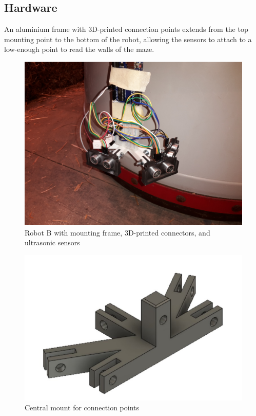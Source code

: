 \documentclass[11pt]{article}
\begin{document}
	\subsection{Hardware}
	An aluminium frame with 3D-printed connection points extends from the top mounting point to the bottom of the robot, allowing the sensors to attach to a low-enough point to read the walls of the maze.
	
	\begin{figure}[h]
		\centering
		\includegraphics[scale=0.1]{ultrasonic_mount}
		\caption{Robot B with mounting frame, 3D-printed connectors, and ultrasonic sensors}
	\end{figure}
	
	\begin{figure}[h]
		\centering
		\includegraphics[scale=0.5]{central_mount_empty}
		\caption{Central mount for connection points}
	\end{figure}
\end{document}
